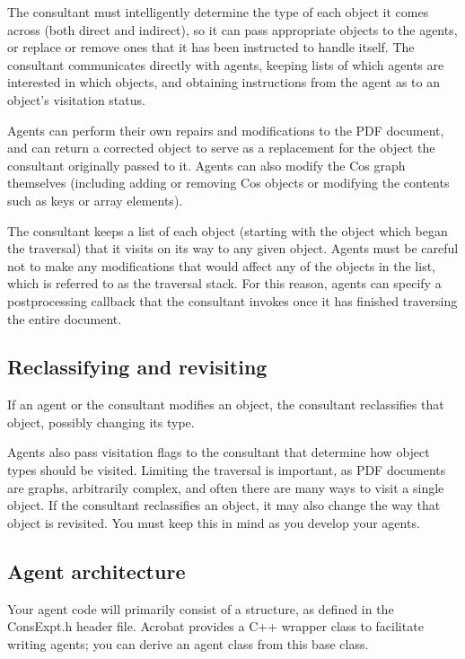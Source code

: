 \documentclass[letterpaper,12pt,english,openany,oneside]{sphinxmanual}
\begin{document}
The consultant must intelligently determine the type of each object it comes across (both direct and indirect), so it can pass appropriate objects to the agents, or replace or remove ones that it has been instructed to handle itself. The consultant communicates directly with agents, keeping lists of which agents are interested in which objects, and obtaining instructions from the agent as to an object’s visitation status.

Agents can perform their own repairs and modifications to the PDF document, and can return a corrected object to serve as a replacement for the object the consultant originally passed to it. Agents can also modify the Cos graph themselves (including adding or removing Cos objects or modifying the contents such as keys or array elements).

The consultant keeps a list of each object (starting with the object which began the traversal) that it visits on its way to any given object. Agents must be careful not to make any modifications that would affect any of the objects in the list, which is referred to as the traversal stack. For this reason, agents can specify a post\sphinxhyphen{}processing callback that the consultant invokes once it has finished traversing the entire document.


\subsection{Reclassifying and revisiting}
\label{\detokenize{Plugins_ExtendedAPI:reclassifying-and-revisiting}}
If an agent or the consultant modifies an object, the consultant reclassifies that object, possibly changing its type.

Agents also pass visitation flags to the consultant that determine how object types should be visited. Limiting the traversal is important, as PDF documents are graphs, arbitrarily complex, and often there are many ways to visit a single object. If the consultant reclassifies an object, it may also change the way that object is revisited. You must keep this in mind as you develop your agents.


\subsection{Agent architecture}
\label{\detokenize{Plugins_ExtendedAPI:agent-architecture}}
Your agent code will primarily consist of a structure, as defined in the ConsExpt.h header file. Acrobat provides a C++ wrapper class to facilitate writing agents; you can derive an agent class from this base class.
\end{document}
